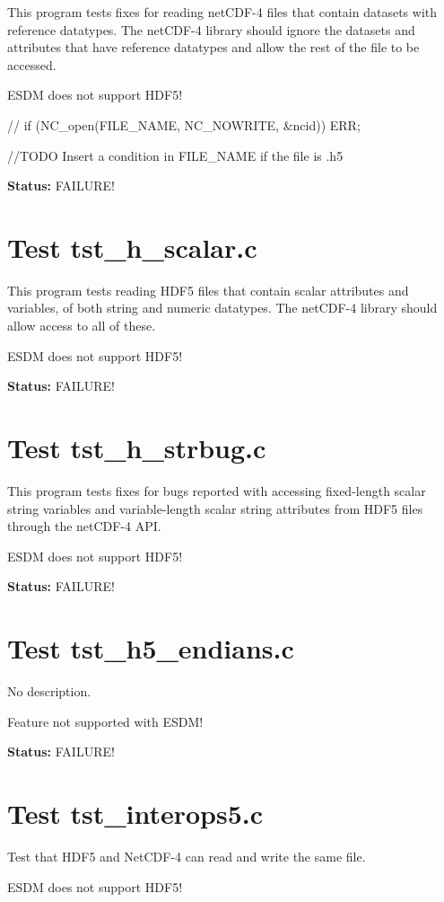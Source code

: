 This program tests fixes for reading netCDF-4 files that contain datasets with reference datatypes.  The netCDF-4 library should ignore the datasets and attributes that have reference datatypes and allow the rest of the file to be accessed.

ESDM does not support HDF5!

// if (NC\_open(FILE\_NAME, NC\_NOWRITE, \&ncid)) ERR;

//TODO Insert a condition in FILE\_NAME if the file is .h5

{\bf \large Status: } FAILURE!

\section{Test tst\_h\_scalar.c}

This program tests reading HDF5 files that contain scalar attributes and variables, of both string and numeric datatypes.  The netCDF-4 library should allow access to all of these.

ESDM does not support HDF5!

{\bf \large Status: } FAILURE!

\section{Test tst\_h\_strbug.c}

This program tests fixes for bugs reported with accessing fixed-length scalar string variables and variable-length scalar string attributes from HDF5 files through the netCDF-4 API.

ESDM does not support HDF5!

{\bf \large Status: } FAILURE!

\section{Test tst\_h5\_endians.c}

No description.

Feature not supported with ESDM!

{\bf \large Status: } FAILURE!

\section{Test tst\_interops5.c}

Test that HDF5 and NetCDF-4 can read and write the same file.

ESDM does not support HDF5!

